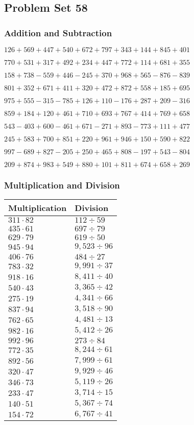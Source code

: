 \hypertarget{problem-set-58-1}{%
\subsection{Problem Set 58}\label{problem-set-58-1}}

\hypertarget{addition-and-subtraction-158}{%
\subsubsection{Addition and
Subtraction}\label{addition-and-subtraction-158}}

\(126 + 569 + 447 + 540 + 672 + 797 + 343 + 144 + 845 + 401\)

\(770 + 531 + 317 + 492 + 234 + 447 + 772 + 114 + 681 + 355\)

\(158 + 738 - 559 + 446 - 245 + 370 + 968 + 565 - 876 - 839\)

\(801 + 352 + 671 + 411 + 320 + 472 + 872 + 558 + 185 + 695\)

\(975 + 555 - 315 - 785 + 126 + 110 - 176 + 287 + 209 - 316\)

\(859 + 184 + 120 + 461 + 710 + 693 + 767 + 414 + 769 + 658\)

\(543 - 403 + 600 - 461 + 671 - 271 + 893 - 773 + 111 + 477\)

\(245 + 583 + 700 + 851 + 220 + 961 + 946 + 150 + 590 + 822\)

\(997 - 689 + 827 - 205 + 250 + 465 + 808 - 197 + 543 - 804\)

\(209 + 874 + 983 + 549 + 880 + 101 + 811 + 674 + 658 + 269\)

\hypertarget{multiplication-and-division-158}{%
\subsubsection{Multiplication and
Division}\label{multiplication-and-division-158}}

\begin{longtable}[]{@{}ll@{}}
\toprule
Multiplication & Division\tabularnewline
\midrule
\endhead
\(311 \cdot 82\) & \(112÷59\)\tabularnewline
\(435 \cdot 61\) & \(697÷79\)\tabularnewline
\(629 \cdot 79\) & \(619÷50\)\tabularnewline
\(945 \cdot 94\) & \(9,523÷96\)\tabularnewline
\(406 \cdot 76\) & \(484÷27\)\tabularnewline
\(783 \cdot 32\) & \(9,991÷37\)\tabularnewline
\(918 \cdot 16\) & \(8,411÷40\)\tabularnewline
\(540 \cdot 43\) & \(3,365÷42\)\tabularnewline
\(275 \cdot 19\) & \(4,341÷66\)\tabularnewline
\(837 \cdot 94\) & \(3,518÷90\)\tabularnewline
\(762 \cdot 65\) & \(4,481÷13\)\tabularnewline
\(982 \cdot 16\) & \(5,412÷26\)\tabularnewline
\(992 \cdot 96\) & \(273÷84\)\tabularnewline
\(772 \cdot 35\) & \(8,244÷61\)\tabularnewline
\(892 \cdot 56\) & \(7,999÷61\)\tabularnewline
\(320 \cdot 47\) & \(9,929÷46\)\tabularnewline
\(346 \cdot 73\) & \(5,119÷26\)\tabularnewline
\(233 \cdot 47\) & \(3,714÷15\)\tabularnewline
\(140 \cdot 51\) & \(5,367÷74\)\tabularnewline
\(154 \cdot 72\) & \(6,767÷41\)\tabularnewline
\bottomrule
\end{longtable}

